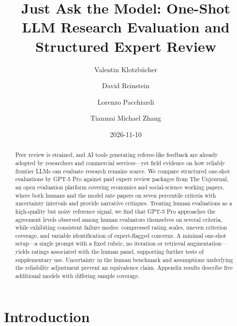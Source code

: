 \documentclass[
  11pt,
  letterpaper,
]{article}
\title{Just Ask the Model: One-Shot LLM Research Evaluation and
Structured Expert Review}
\author{Valentin Klotzbücher \and David Reinstein \and Lorenzo
Pacchiardi \and Tianmai Michael Zhang}
\date{2026-11-10}
\begin{document}
\maketitle
\begin{abstract}
Peer review is strained, and AI tools generating referee-like feedback
are already adopted by researchers and commercial services---yet field
evidence on how reliably frontier LLMs can evaluate research remains
scarce. We compare structured one-shot evaluations by GPT-5 Pro against
paid expert review packages from The Unjournal, an open evaluation
platform covering economics and social-science working papers, where
both humans and the model rate papers on seven percentile criteria with
uncertainty intervals and provide narrative critiques. Treating human
evaluations as a high-quality but noisy reference signal, we find that
GPT-5 Pro approaches the agreement levels observed among human
evaluators themselves on several criteria, while exhibiting consistent
failure modes: compressed rating scales, uneven criterion coverage, and
variable identification of expert-flagged concerns. A minimal one-shot
setup---a single prompt with a fixed rubric, no iteration or retrieval
augmentation---yields ratings associated with the human panel,
supporting further tests of supplementary use. Uncertainty in the human
benchmark and assumptions underlying the reliability adjustment prevent
an equivalence claim. Appendix results describe five additional models
with differing sample coverage.
\end{abstract}



\section{Introduction}\label{introduction}

\label{update-history}{}
\end{document}
